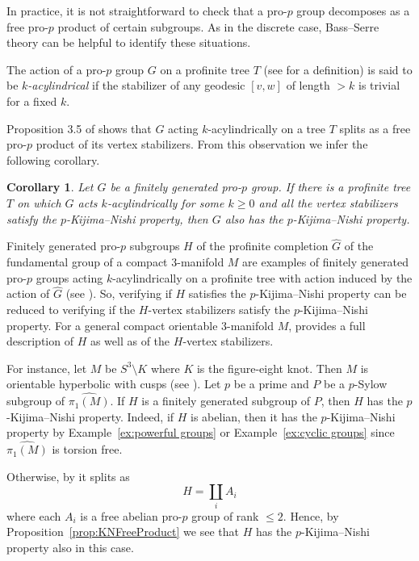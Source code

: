 \documentclass{amsart}
\newtheorem{cor}[thm]{Corollary}
\theoremstyle{definition}
\theoremstyle{remark}
\begin{document}
In practice, it is not straightforward to check that a pro-$p$ group decomposes as a free pro-$p$ product of certain subgroups. As in the discrete case, Bass--Serre theory can be helpful to identify these situations.

The action of a pro-$p$ group $G$ on a profinite tree $T$ (see \cite[\S 2.4]{Rib17} for a definition) is said to be {\it $k$-acylindrical} if the stabilizer of any geodesic $[v,w]$ of length $>k$ is trivial for a fixed $k$.

Proposition 3.5 of \cite{WZ17} shows that $G$ acting $k$-acylindrically on a tree $T$ splits as a free pro-$p$ product of its vertex stabilizers. From this observation we infer the following corollary.
\begin{cor}\label{cor:acylindricalaction}
Let $G$ be a finitely generated pro-$p$ group. If there is a profinite tree $T$ on which $G$ acts $k$-acylindrically for some $k\geq 0$ and all the vertex stabilizers satisfy the $p$-Kijima--Nishi property, then $G$ also has the $p$-Kijima--Nishi property.
\end{cor}
Finitely generated pro-$p$ subgroups $H$ of the profinite completion $\widehat{G}$ of the fundamental group of a compact $3$-manifold $M$ are examples of finitely generated pro-$p$ groups acting $k$-acylindrically on a profinite tree with action induced by the action of $\widehat{G}$ (see \cite{WZ17}). So, verifying if $H$ satisfies the $p$-Kijima--Nishi property can be reduced to verifying if the $H$-vertex stabilizers satisfy the $p$-Kijima--Nishi property. For a general compact orientable $3$-manifold $M$, \cite[Thm. 1.3]{WZ17} provides a full description of $H$ as well as of the $H$-vertex stabilizers.

For instance, let $M$ be $S^3 \setminus K$ where $K$ is the figure-eight knot. Then $M$ is orientable hyperbolic with cusps (see \cite[\S 4.3]{Thu22}). Let $p$ be a prime and $P$ be a $p$-Sylow subgroup of $\widehat{\pi_1(M)}$. If $H$ is a finitely generated subgroup of $P$, then $H$ has the $p$-Kijima--Nishi property. Indeed, if $H$ is abelian, then it has the $p$-Kijima--Nishi property by Example~\ref{ex:powerful groups} or Example~\ref{ex:cyclic groups} since $\widehat{\pi_1(M)}$ is torsion free. 

Otherwise, by \cite[Thm. 1.2]{WZ17A} it splits as
$$H = \coprod_i A_i$$
where each $A_i$ is a free abelian pro-$p$ group of rank $\leq 2$. Hence, by Proposition~\ref{prop:KNFreeProduct} we see that $H$ has the $p$-Kijima--Nishi property also in this case.
\end{document}
